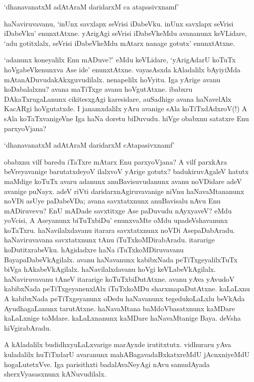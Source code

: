 \begin{shloka}
`dhanavanatxM adAtAraM daridarxM ca atapasivxnamf'
\end{shloka}

haNaviruvavanu, `inUnx savxlapx seVrisi iDabeVku. inUnx savxlapx seVrisi iDabeVku' enunxtAtxne. yArigAgi seVrisi iDabeVkeMdu avananunx keVLidare, `adu gotitxlalx, seVrisi iDabeVkeMdu mAtarx nanage gotutx' enunxtAtxne.

`adanunx koneyalilx Enu mADuve?' eMdu keVLidare, `yArigAdarU koTuTx hoVgabeVkenunxva Ase ide' enunxtAtxne. vayasAsxda kAladalilx bAyiyiMda mAtanADuvudakAkxguvudilalx. nenapelilx hoVyitu. Iga yArige avanu koDabalalxnu? avana maTiTxge avanu hoVgutAtxne. ibabxru DAkaTxrugaLanunx cikitesxgAgi karesidare, auSadhige avana haNavelAlx KacARgi hoVgutatxde. I janamxdalilx yAru avanige sAla koTiTxdAdxroV(!) A sAla koTaTxvanigeVne Iga haNa doretu biDuvudu. hiVge obabxnu satatxre Enu parxyoVjana?

\begin{shloka}
`dhanavanatxM adAtAraM daridarxM cAtapasivxnamf'
\end{shloka}

obabxnu vilf baredu iTaTxre mAtarx Enu parxyoVjana? A vilf parxkAra beVreyavanige barutatxdeyoV ilalxvoV yArige gotutx? badukiruvAgaleV hatutx maMdige koTuTx avaru adanunx anuBavisuvudanunx avanu noVDidare adeV avanige puNayx. adeV riVti daridarxnAgiruvavanige niVnu haNavaMtananunx noVDi asUye paDabeVDa; avana savxtatxnunx anuBavisalu nAvu Enu mADiruvevu? EnU mADade savxtitxge Ase paDuvudu nAyxyaveV? eMdu yoVcisi, A Aseyanunx biTuTxbiDu' enunxvaMte oMdu upadeVshavanunx koTaTxru. haNavilalxdavanu itarara savxtatxnunx noVDi AsepaDabAradu. haNaviruvavana savxtatxnunx tAnu iTuTxkoMDirabAradu. itararige koDutitxrabeVku. hAgidadxre haNa iTuTxkoMDiruvavanu BayapaDabeVkAgilalx. avanu haNavanunx kabibxNada peTiTxgeyalilxTuTx biVga hAkabeVkAgilalx. haNavilalxdavanu hoVgi keVLabeVkAgilalx. haNaviruvavanu tAneV itararige koTuTxbiDutAtxne. avanu yAva yAvudoV kabibxNada peTiTxgeyanenxlAlx iTuTxkoMDu sharxmapaDutAtxne. kaLaLxnu A kabibxNada peTiTxgeyanunx oDedu haNavanunx tegedukoLaLxlu beVkAda AyudhagaLanunx tarutAtxne. haNavaMtana baMdoVbasatxnunx kaMDare kaLaLxnige toMdare. kaLaLxnanunx kaMDare haNavaMtanige Baya. deVsha hiVgirabAradu.

A kAladalilx budidhxyuLaLxvarige marAyxde irutitxtutx. vidhuraru yAva kuladalilx huTiTxdarU avaranunx mahABagavadaBxkatxreMdU jAcnxniyeMdU hogaLutetxVve. Iga parisithxti badalAvaNeyAgi nAvu samudAyada sherxVyasasxnunx kANuvudilalx.

